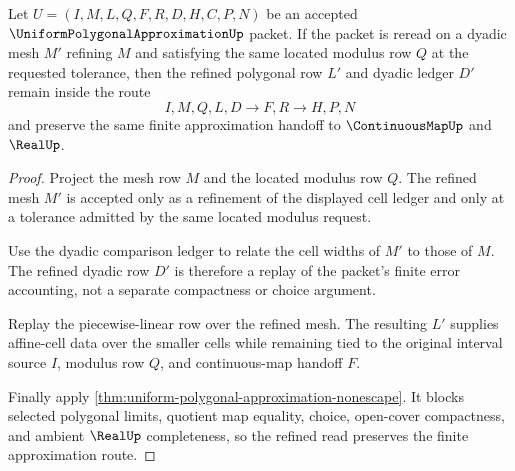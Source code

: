 \begin{theorem}
\label{thm:uniform-polygonal-approximation-mesh-refinement}
Let $U=(I,M,L,Q,F,R,D,H,C,P,N)$ be an accepted $\UniformPolygonalApproximationUp$ packet. If the packet is reread on a dyadic mesh $M'$ refining $M$ and satisfying the same located modulus row $Q$ at the requested tolerance, then the refined polygonal row $L'$ and dyadic ledger $D'$ remain inside the route
$$
I,M,Q,L,D \to F,R \to H,P,N
$$
and preserve the same finite approximation handoff to $\ContinuousMapUp$ and $\RealUp$.
\end{theorem}
\begin{proof}
Project the mesh row $M$ and the located modulus row $Q$. The refined mesh $M'$ is accepted only as a refinement of the displayed cell ledger and only at a tolerance admitted by the same located modulus request.

Use the dyadic comparison ledger to relate the cell widths of $M'$ to those of $M$. The refined dyadic row $D'$ is therefore a replay of the packet's finite error accounting, not a separate compactness or choice argument.

Replay the piecewise-linear row over the refined mesh. The resulting $L'$ supplies affine-cell data over the smaller cells while remaining tied to the original interval source $I$, modulus row $Q$, and continuous-map handoff $F$.

Finally apply \autoref{thm:uniform-polygonal-approximation-nonescape}. It blocks selected polygonal limits, quotient map equality, choice, open-cover compactness, and ambient $\RealUp$ completeness, so the refined read preserves the finite approximation route.
\end{proof}



